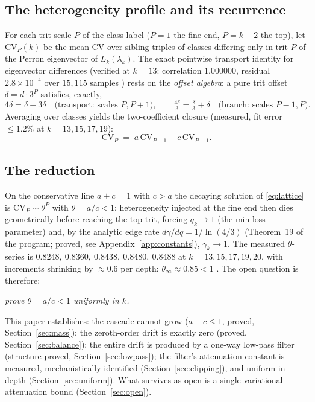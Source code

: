 \documentclass[11pt]{article}
\theoremstyle{definition}
\theoremstyle{remark}
\newcommand{\CV}{\mathrm{CV}}
\newcommand{\lam}{\lambda}
\newcommand{\gam}{\gamma}
\begin{document}
\subsection{The heterogeneity profile and its recurrence}

For each trit scale $P$ of the class label ($P = 1$ the fine end,
$P = k-2$ the top), let $\CV_P(k)$ be the mean $\CV$ over sibling triples
of classes differing only in trit $P$ of the Perron eigenvector of
$L_k(\lam_k)$. The exact pointwise transport identity for eigenvector
differences (verified at $k=13$: correlation $1.000000$, residual
$2.8 \times 10^{-4}$ over $15{,}115$ samples \cite{Temp26}) rests on the
\emph{offset algebra}: a pure trit offset $\delta = d \cdot 3^P$
satisfies, exactly,
\begin{equation}
4\delta = \delta + 3\delta
\quad \text{(transport: scales } P, P{+}1\text{)}, \qquad
\tfrac{4\delta}{3} = \tfrac{\delta}{3} + \delta
\quad \text{(branch: scales } P{-}1, P\text{)}.
\label{eq:offsetalg}
\end{equation}
Averaging over classes yields the two-coefficient closure (measured, fit
error $\leq 1.2\%$ at $k = 13, 15, 17, 19$):
\begin{equation}
\CV_P \;=\; a\, \CV_{P-1} + c\, \CV_{P+1} .
\label{eq:lattice}
\end{equation}

\subsection{The reduction}

On the conservative line $a + c = 1$ with $c > a$ the decaying solution of
\eqref{eq:lattice} is $\CV_P \sim \theta^P$ with $\theta = a/c < 1$;
heterogeneity injected at the fine end then dies geometrically before
reaching the top trit, forcing $q_k \to 1$ (the min-loss parameter) and,
by the analytic edge rate $d\gam/dq = 1/\ln(4/3)$
(Theorem~19 of the program; proved, see Appendix~\ref{app:constants}),
$\gam_k \to 1$. The measured $\theta$-series is
$0.8248,\ 0.8360,\ 0.8438,\ 0.8480,\ 0.8488$ at $k = 13, 15, 17, 19, 20$,
with increments shrinking by $\approx 0.6$ per depth:
$\theta_\infty \approx 0.85 < 1$ \cite{Temp26}. The open question is
therefore:
\begin{center}
\emph{prove $\theta = a/c < 1$ uniformly in $k$.}
\end{center}
This paper establishes: the cascade cannot grow ($a + c \leq 1$, proved,
Section~\ref{sec:mass}); the zeroth-order drift is exactly zero (proved,
Section~\ref{sec:balance}); the entire drift is produced by a one-way
low-pass filter (structure proved, Section~\ref{sec:lowpass}); the filter's
attenuation constant is measured, mechanistically identified
(Section~\ref{sec:clipping}), and uniform in depth
(Section~\ref{sec:uniform}). What survives as open is a single variational
attenuation bound (Section~\ref{sec:open}).
\end{document}
